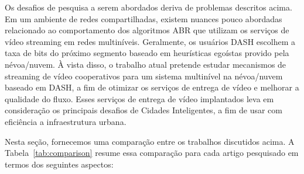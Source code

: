 Os desafios de pesquisa a serem abordados deriva de problemas descritos acima.
Em um ambiente de redes compartilhadas, existem nuances pouco abordadas relacionado ao comportamento dos algoritmos ABR que utilizam os serviços de vídeo streaming em redes multiníveis. Geralmente, os usuários DASH escolhem a taxa de bits do próximo segmento baseado em heurísticas egoístas provido pela névoa/nuvem. 
À vista disso, o trabalho atual pretende estudar mecanismos de streaming de vídeo cooperativos para um sistema multinível na névoa/nuvem baseado em DASH, a fim de otimizar os serviços de entrega de vídeo e melhorar a qualidade do fluxo. 
Esses serviços de entrega de vídeo implantados leva em consideração os principais desafios de Cidades Inteligentes, a fim de usar com eficiência a infraestrutura urbana. 



Nesta seção, fornecemos uma comparação entre os trabalhos discutidos acima.
A Tabela~\ref{tab:comparison} resume essa comparação para cada artigo pesquisado em termos dos seguintes aspectos:

